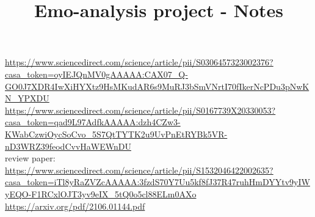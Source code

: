 \documentclass[letterpaper, 10pt]{article}
\begin{document}
\title{Emo-analysis project - Notes}

\maketitle

\url{https://www.sciencedirect.com/science/article/pii/S0306457323002376?casa_token=oyIEJQnMV0gAAAAA:CAX07_Q-GO0J7XDR4IwXiHYXtz9HsMKudAR6s9MuRJ3bSmVNrtI70fIkerNcPDu3pNwKN_YPXDU} \\
\url{https://www.sciencedirect.com/science/article/pii/S0167739X20330053?casa_token=qad9L97AdfkAAAAA:dzh4CZw3-KWabCzwiOycSoCvo_5S7QtTYTK2u9UvPnEtRYBk5VR-nD3WRZ39feodCvvHaWEWnDU} \\
review paper: \url{https://www.sciencedirect.com/science/article/pii/S1532046422002635?casa_token=iTl8yRaZVZcAAAAA:3fzdS70Y7Uu5kf8fJ37R47ruhHmDYYtv9yIWyEQO-F1RCxlOJT3yv9eIX_5tQ0o5cl88ELm0AXo} \\
\url{https://arxiv.org/pdf/2106.01144.pdf}



\end{document}
